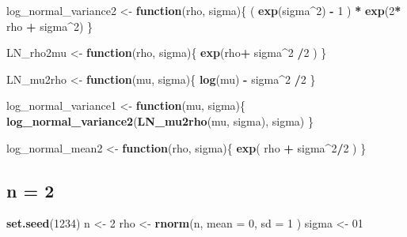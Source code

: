 \documentclass[
]{book}
\newenvironment{Shaded}{\begin{snugshade}}{\end{snugshade}}
\newcommand{\ControlFlowTok}[1]{\textcolor[rgb]{0.13,0.29,0.53}{\textbf{#1}}}
\newcommand{\DataTypeTok}[1]{\textcolor[rgb]{0.13,0.29,0.53}{#1}}
\newcommand{\DecValTok}[1]{\textcolor[rgb]{0.00,0.00,0.81}{#1}}
\newcommand{\KeywordTok}[1]{\textcolor[rgb]{0.13,0.29,0.53}{\textbf{#1}}}
\newcommand{\NormalTok}[1]{#1}
\newcommand{\OperatorTok}[1]{\textcolor[rgb]{0.81,0.36,0.00}{\textbf{#1}}}
\newcommand{\StringTok}[1]{\textcolor[rgb]{0.31,0.60,0.02}{#1}}
\begin{document}
\begin{Shaded}
\begin{Highlighting}[]
\NormalTok{log_normal_variance2 <-}\StringTok{ }\ControlFlowTok{function}\NormalTok{(rho, sigma)\{}
\NormalTok{  ( }\KeywordTok{exp}\NormalTok{(sigma}\OperatorTok{^}\DecValTok{2}\NormalTok{) }\OperatorTok{-}\StringTok{ }\DecValTok{1}\NormalTok{ ) }\OperatorTok{*}\StringTok{ }\KeywordTok{exp}\NormalTok{(}\DecValTok{2}\OperatorTok{*}\StringTok{ }\NormalTok{rho  }\OperatorTok{+}\StringTok{ }\NormalTok{sigma}\OperatorTok{^}\DecValTok{2}\NormalTok{)}
\NormalTok{\}}

\NormalTok{LN_rho2mu <-}\StringTok{ }\ControlFlowTok{function}\NormalTok{(rho, sigma)\{}
   \KeywordTok{exp}\NormalTok{(rho}\OperatorTok{+}\StringTok{ }\NormalTok{sigma}\OperatorTok{^}\DecValTok{2} \OperatorTok{/}\DecValTok{2}\NormalTok{ )}
\NormalTok{\}}

\NormalTok{LN_mu2rho <-}\StringTok{ }\ControlFlowTok{function}\NormalTok{(mu, sigma)\{}
   \KeywordTok{log}\NormalTok{(mu) }\OperatorTok{-}\StringTok{ }\NormalTok{sigma}\OperatorTok{^}\DecValTok{2} \OperatorTok{/}\DecValTok{2}
\NormalTok{\}}

\NormalTok{log_normal_variance1 <-}\StringTok{ }\ControlFlowTok{function}\NormalTok{(mu, sigma)\{}
  \KeywordTok{log_normal_variance2}\NormalTok{(}\KeywordTok{LN_mu2rho}\NormalTok{(mu, sigma), sigma)}
\NormalTok{\}}

\NormalTok{log_normal_mean2 <-}\StringTok{ }\ControlFlowTok{function}\NormalTok{(rho, sigma)\{}
   \KeywordTok{exp}\NormalTok{( rho }\OperatorTok{+}\StringTok{ }\NormalTok{sigma}\OperatorTok{^}\DecValTok{2}\OperatorTok{/}\DecValTok{2}\NormalTok{ )}
\NormalTok{\}}
\end{Highlighting}
\end{Shaded}

\hypertarget{n-2}{%
\subsection{n = 2}\label{n-2}}

\begin{Shaded}
\begin{Highlighting}[]
\KeywordTok{set.seed}\NormalTok{(}\DecValTok{1234}\NormalTok{)}
\NormalTok{n <-}\StringTok{ }\DecValTok{2}
\NormalTok{rho <-}\StringTok{ }\KeywordTok{rnorm}\NormalTok{(n, }\DataTypeTok{mean =} \DecValTok{0}\NormalTok{, }\DataTypeTok{sd =} \DecValTok{1}\NormalTok{ )}
\NormalTok{sigma <-}\StringTok{ }\DecValTok{01}
\end{Highlighting}
\end{Shaded}
\end{document}
